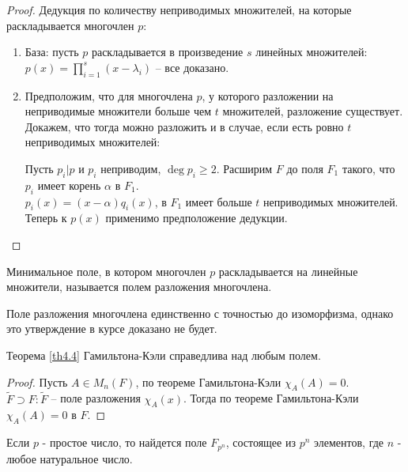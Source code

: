 \begin{proof}
    Дедукция по количеству неприводимых множителей, на которые раскладывается многочлен $p$:
    \begin{enumerate}
        \item База: пусть $p$ раскладывается в произведение $s$ линейных множителей: $p(x) = \displaystyle\prod_{i = 1}^s (x - \lambda_i)$ -- все доказано.
        \item Предположим, что для многочлена $p$, у которого  разложении на неприводимые множители больше чем $t$ множителей, разложение существует. Докажем, что тогда можно разложить и в случае, если есть ровно $t$ неприводимых множителей:

        Пусть $p_i \vert p$ и $p_i$ неприводим, $\deg p_i \geq 2$. Расширим $F$ до поля $F_1$ такого, что $p_i$ имеет корень $\alpha$ в $F_1$. \\
        $p_i(x) = (x - \alpha) q_i(x)$, в $F_1$ имеет больше $t$ неприводимых множителей. Теперь к $p(x)$ применимо предположение дедукции.
    \end{enumerate}
\end{proof}

\begin{definition}
    Минимальное поле, в котором многочлен $p$ раскладывается на линейные множители, называется полем разложения многочлена.
\end{definition}

\begin{note}
    Поле разложения многочлена единственно с точностью до изоморфизма, однако это утверждение в курсе доказано не будет.
\end{note}

\begin{corollary}
    Теорема \ref{th4.4} Гамильтона-Кэли справедлива над любым полем.
\end{corollary}

\begin{proof}
    Пусть $A \in M_n(F)$, по теореме Гамильтона-Кэли $\chi_A (A) = 0$. \\
    $\tilde{F} \supset F: \tilde{F}$ -- поле разложения $\chi_A(x)$. Тогда по теореме Гамильтона-Кэли $\chi_A(A) = 0$ в $F$.
\end{proof}

\begin{theorem}
    Если $p$ - простое число, то найдется поле $F_{p^n}$, состоящее из $p^n$ элементов, где $n$ - любое натуральное число.
\end{theorem}

